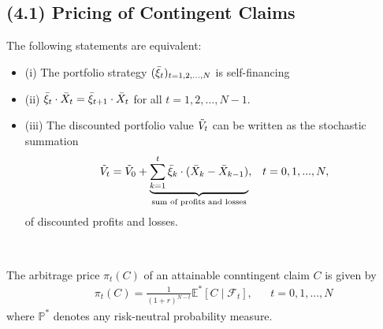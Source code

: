 \documentclass[12pt]{extarticle}
\newcommand{\<}{\langle}
\renewcommand{\>}{\rangle}
\theoremstyle{definition}
\begin{document}
\subsection{(4.1) Pricing of Contingent Claims}
\begin{tcolorbox}[enhanced, drop fuzzy shadow, title=Lemma 4.2]
The following statements are equivalent:
\begin{itemize}
    \item (i) The portfolio strategy $(\Bar{\xi}_t)_{t=1,2,...,N}$ is self-financing \\
    \item (ii) $\Bar{\xi}_t \cdot \Bar{X}_t = \Bar{\xi}_{t+1} \cdot \Bar{X}_t$ for all $t=1,2,...,N-1$. \\
    \item (iii) The discounted portfolio value $\Tilde{V}_t$ can be written as the stochastic summation
    \begin{align*}
        \Tilde{V}_t = \Tilde{V}_0 + \underbrace{\sum^t_{k=1}\Bar{\xi}_k \cdot (\Bar{X}_k - \Bar{X}_{k-1})}_\text{sum of profits and losses}, && t=0,1,...,N,
    \end{align*}
    of discounted profits and losses.
\end{itemize}
\end{tcolorbox}
\ \\
\begin{tcolorbox}[enhanced, drop fuzzy shadow, title=Theorem 4.5]
The arbitrage price $\pi_t (C)$ of an attainable conntingent claim $C$ is given by
\begin{align*}
    && \pi_t (C)=\frac{1}{(1+r)^{N-t}}\mathbb{E}^* [C \mid \mathcal{F}_t], && t=0,1,...,N
\end{align*}
where $\mathbb{P}^*$ denotes any risk-neutral probability measure.
\end{tcolorbox}
\end{document}
